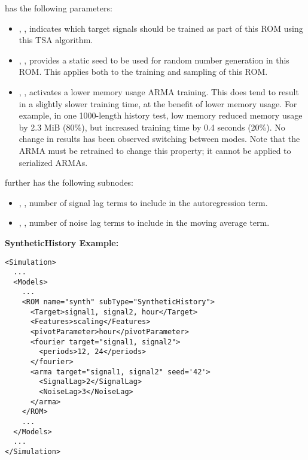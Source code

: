 \begin{itemize}
     has the following parameters:
    \begin{itemize}
      \item {}, , indicates which
        target signals should be trained as part of this ROM using this TSA algorithm.
      \item {}, , provides a static seed to be used for
        random number generation in this ROM. This applies both to the training and sampling of this
        ROM.
      \item {}, , activates a lower memory
        usage ARMA training. This does tend to result
        in a slightly slower training time, at the benefit of lower memory usage. For
        example, in one 1000-length history test, low memory reduced memory usage by 2.3
        MiB (80\%), but increased training time by 0.4 seconds (20\%). No change in results has been
        observed switching between modes. Note that the ARMA must be
        retrained to change this property; it cannot be applied to serialized ARMAs.
    \end{itemize}
     further has the following subnodes:
    \begin{itemize}
      \item {}, , number of signal lag terms to
        include in the autoregression term.
      \item {}, , number of noise lag terms to
        include in the moving average term.
    \end{itemize}
\end{itemize}




\textbf{SyntheticHistory Example:}
\begin{lstlisting}[style=XML,morekeywords={name,subType,pivotLength,shift,target,threshold,period,width}]
<Simulation>
  ...
  <Models>
    ...
    <ROM name="synth" subType="SyntheticHistory">
      <Target>signal1, signal2, hour</Target>
      <Features>scaling</Features>
      <pivotParameter>hour</pivotParameter>
      <fourier target="signal1, signal2">
        <periods>12, 24</periods>
      </fourier>
      <arma target="signal1, signal2" seed='42'>
        <SignalLag>2</SignalLag>
        <NoiseLag>3</NoiseLag>
      </arma>
    </ROM>
    ...
  </Models>
  ...
</Simulation>
\end{lstlisting}


